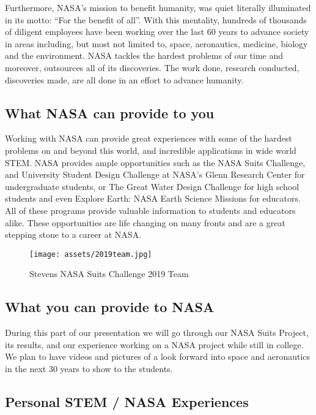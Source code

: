 \documentclass{article}
\let\Oldsubsection\subsection
\renewcommand{\subsection}{\FloatBarrier\Oldsubsection}
\begin{document}
Furthermore, NASA’s mission to benefit humanity, was quiet literally illuminated in its motto: “For the benefit of all”. With this mentality, hundreds of thousands of diligent employees have been working over the last 60 years to advance society in areas including, but most not limited to, space, aeronautics, medicine, biology and the environment. NASA tackles the hardest problems of our time and moreover, outsources all of its discoveries. The work done, research conducted, discoveries made, are all done in an effort to advance humanity.

\subsection{What NASA can provide to you}

Working with NASA can provide great experiences with some of the hardest problems on and beyond this world, and incredible applications in wide world STEM. NASA provides ample opportunities such as the NASA Suits Challenge, and University Student Design Challenge at NASA’s Glenn Research Center for undergraduate students, or The Great Water Design Challenge for high school students and even Explore Earth: NASA Earth Science Missions for educators. All of these programs provide valuable information to students and educators alike. These opportunities are life changing on many fronts and are a great stepping stone to a career at NASA. 

\begin{figure}[!htb]
  \centering
  \texttt{[image: assets/2019team.jpg]}
  \caption{Stevens NASA Suits Challenge 2019 Team}
  \label{fig:2019Team}
\end{figure}


\subsection{What you can provide to NASA}

During this part of our presentation we will go through our NASA Suits Project, its results, and our experience working on a NASA project while still in college. We plan to have videos and pictures of a look forward into space and aeronautics in the next 30 years to show to the students.

\subsection{Personal STEM / NASA Experiences}
\end{document}
